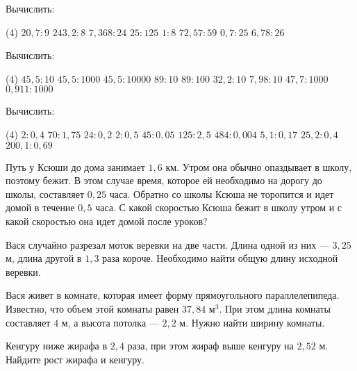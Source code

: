 \begin{consultation}
	\begin{listofex}
		\item Вычислить:
		\begin{tasks}(4)
			\task \( 20,7:9 \)
			\task \( 243,2:8 \)
			\task \( 7,368:24 \)
			\task \( 25:125 \)
			\task \( 1:8 \)
			\task \( 72,57:59 \)
			\task \( 0,7:25 \)
			\task \( 6,78:26 \)
		\end{tasks}
		\item Вычислить:
		\begin{tasks}(4)
			\task \( 45,5:10 \)
			\task \( 45,5:1000 \)
			\task \( 45,5:10000 \)
			\task \( 89:10 \)
			\task \( 89:100 \)
			\task \( 32,2:10 \)
			\task \( 7,98:10 \)
			\task \( 47,7:1000 \)
			\task \( 0,911:1000 \)
		\end{tasks}
		\item Вычислить:
		\begin{tasks}(4)
			\task \( 2:0,4 \)
			\task \( 70:1,75 \)
			\task \( 24:0,2 \)
			\task \( 2:0,5 \)
			\task \( 45:0,05 \)
			\task \( 125:2,5 \)
			\task \( 484:0,004 \)
			\task \( 5,1:0,17 \)
			\task \( 25,2:0,4 \)
			\task \( 200,1:0,69 \)
		\end{tasks}
		\item Путь у Ксюши до дома занимает \( 1,6 \) км. Утром она обычно опаздывает в школу, поэтому бежит. В этом случае время, которое ей необходимо на дорогу до школы, составляет \( 0,25 \) часа. Обратно со школы Ксюша не торопится и идет домой в течение \( 0,5 \) часа. С какой скоростью Ксюша бежит в школу утром и с какой скоростью она идет домой после уроков?
		\item Вася случайно разрезал моток веревки на две части. Длина одной из них --- \( 3,25 \) м, длина другой в \( 1,3 \) раза короче. Необходимо найти общую длину исходной веревки.
		\item Вася живет в комнате, которая имеет форму прямоугольного параллелепипеда. Известно, что объем этой комнаты равен \( 37,84 \) м\( ^3 \). При этом длина комнаты составляет \( 4 \) м, а высота потолка --- \( 2,2 \) м. Нужно найти ширину комнаты. 
		\item Кенгуру ниже жирафа в \( 2,4 \) раза, при этом жираф выше кенгуру на \( 2,52 \) м. Найдите рост жирафа и кенгуру.
	\end{listofex}
\end{consultation}
